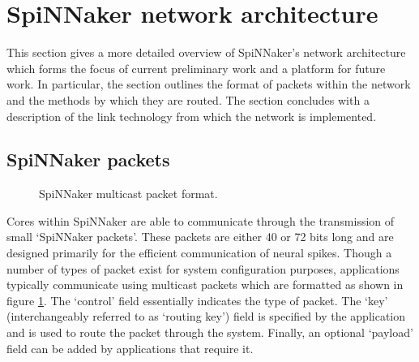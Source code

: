	\section{SpiNNaker network architecture}
		\label{sec:spinnaker}
		
		
		This section gives a more detailed overview of SpiNNaker's network
		architecture which forms the focus of current preliminary work and a
		platform for future work. In particular, the section outlines the format of
		packets within the network and the methods by which they are routed. The
		section concludes with a description of the link technology from which the
		network is implemented.
		
		\subsection{SpiNNaker packets}
			
			
			\begin{figure}
				\center
				
				
				\caption{SpiNNaker multicast packet format.}
				\label{fig:spinnaker-packet}
			\end{figure}
			
			Cores within SpiNNaker are able to communicate through the transmission of
			small `SpiNNaker packets'. These packets are either 40 or 72 bits long and
			are designed primarily for the efficient communication of neural spikes.
			Though a number of types of packet exist for system configuration
			purposes, applications typically communicate using multicast packets which
			are formatted as shown in figure \ref{fig:spinnaker-packet}. The `control'
			field essentially indicates the type of packet. The `key' (interchangeably
			referred to as `routing key') field is specified by the application and is
			used to route the packet through the system. Finally, an optional
			`payload' field can be added by applications that require it.
			
